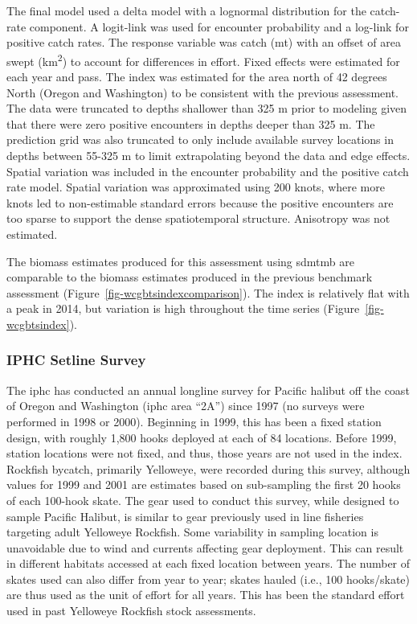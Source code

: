 \documentclass[
]{scrartcl}
\begin{document}
The final model used a delta model with a lognormal distribution for the
catch-rate component. A logit-link was used for encounter probability
and a log-link for positive catch rates. The response variable was catch
(mt) with an offset of area swept (km\textsuperscript{2}) to account for
differences in effort. Fixed effects were estimated for each year and
pass. The index was estimated for the area north of 42 degrees North
(Oregon and Washington) to be consistent with the previous assessment.
The data were truncated to depths shallower than 325 m prior to modeling
given that there were zero positive encounters in depths deeper than 325
m. The prediction grid was also truncated to only include available
survey locations in depths between 55-325 m to limit extrapolating
beyond the data and edge effects. Spatial variation was included in the
encounter probability and the positive catch rate model. Spatial
variation was approximated using 200 knots, where more knots led to
non-estimable standard errors because the positive encounters are too
sparse to support the dense spatiotemporal structure. Anisotropy was not
estimated.

The biomass estimates produced for this assessment using \gls{sdmtmb}
are comparable to the biomass estimates produced in the previous
benchmark assessment (Figure~\ref{fig-wcgbtsindexcomparison}). The index
is relatively flat with a peak in 2014, but variation is high throughout
the time series (Figure~\ref{fig-wcgbtsindex}).

\subsubsection{IPHC Setline Survey}\label{iphc-setline-survey}

The \gls{iphc} has conducted an annual longline survey for Pacific
halibut off the coast of Oregon and Washington (\gls{iphc} area ``2A'')
since 1997 (no surveys were performed in 1998 or 2000). Beginning in
1999, this has been a fixed station design, with roughly 1,800 hooks
deployed at each of 84 locations. Before 1999, station locations were
not fixed, and thus, those years are not used in the index. Rockfish
bycatch, primarily Yelloweye, were recorded during this survey, although
values for 1999 and 2001 are estimates based on sub-sampling the first
20 hooks of each 100-hook skate. The gear used to conduct this survey,
while designed to sample Pacific Halibut, is similar to gear previously
used in line fisheries targeting adult Yelloweye Rockfish. Some
variability in sampling location is unavoidable due to wind and currents
affecting gear deployment. This can result in different habitats
accessed at each fixed location between years. The number of skates used
can also differ from year to year; skates hauled (i.e., 100 hooks/skate)
are thus used as the unit of effort for all years. This has been the
standard effort used in past Yelloweye Rockfish stock assessments.
\end{document}
